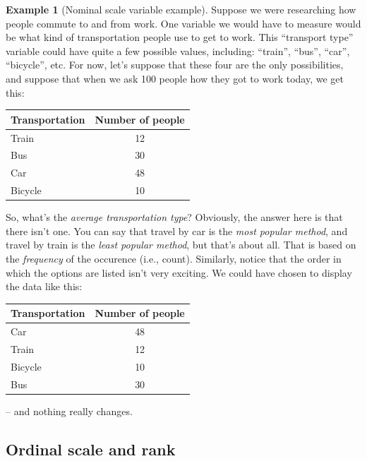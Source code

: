 \documentclass[
  11pt,
]{book}
\theoremstyle{definition}
\theoremstyle{definition}
\newtheorem{example}{Example}[chapter]
\theoremstyle{definition}
\theoremstyle{definition}
\theoremstyle{remark}
\begin{document}
\begin{example}[Nominal scale variable example]
\protect\hypertarget{exm:exnominal}{}\label{exm:exnominal}Suppose we were researching how people commute to and from work. One variable we would have to measure would be what kind of transportation people use to get to work. This ``transport type'' variable could have quite a few possible values, including: ``train'', ``bus'', ``car'', ``bicycle'', etc. For now, let's suppose that these four are the only possibilities, and suppose that when we ask 100 people how they got to work today, we get this:

\begin{table}[H]
\centering
\begin{tabular}{lc}
\toprule
Transportation & Number of people\\
\midrule
Train & 12\\
Bus & 30\\
Car & 48\\
Bicycle & 10\\
\bottomrule
\end{tabular}
\end{table}

So, what's the \emph{average transportation type}? Obviously, the answer here is that there isn't one. You can say that travel by car is the \emph{most popular method}, and travel by train is the \emph{least popular method}, but that's about all. That is based on the \emph{frequency} of the occurence (i.e., count). Similarly, notice that the order in which the options are listed isn't very exciting. We could have chosen to display the data like this:

\begin{table}[H]
\centering
\begin{tabular}{lc}
\toprule
Transportation & Number of people\\
\midrule
Car & 48\\
Train & 12\\
Bicycle & 10\\
Bus & 30\\
\bottomrule
\end{tabular}
\end{table}

-- and nothing really changes.
\end{example}

\hypertarget{ordinalscale}{%
\subsection{Ordinal scale and rank}\label{ordinalscale}}
\end{document}
